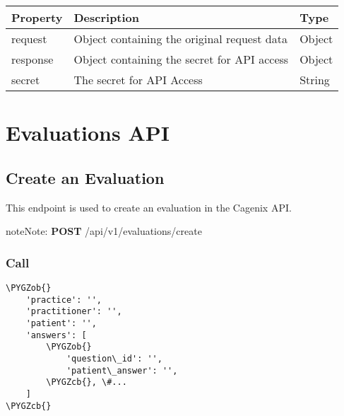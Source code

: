 \documentclass[letterpaper,10pt,english]{sphinxmanual}
\def\PYGZob{\char`\{}
\def\PYGZcb{\char`\}}
\begin{document}
\begin{tabulary}{\linewidth}{|L|L|L|}
\hline
\textsf{\relax 
Property
} & \textsf{\relax 
Description
} & \textsf{\relax 
Type
}\\
\hline
request
 & 
Object containing the original
request data
 & 
Object
\\

response
 & 
Object containing the secret for
API access
 & 
Object
\\

secret
 & 
The secret for API Access
 & 
String
\\
\hline\end{tabulary}



\chapter{Evaluations API}
\label{dev-api-evaluations::doc}\label{dev-api-evaluations:evaluations-api}

\section{Create an Evaluation}
\label{dev-api-evaluations:create-an-evaluation}
This endpoint is used to create an evaluation in the Cagenix API.

\begin{notice}{note}{Note:}
\textbf{POST} /api/v1/evaluations/create
\end{notice}


\subsection{Call}
\label{dev-api-evaluations:call}
\begin{Verbatim}[commandchars=\\\{\}]
\PYGZob{}
    'practice': '',
    'practitioner': '',
    'patient': '',
    'answers': [
        \PYGZob{}
            'question\_id': '',
            'patient\_answer': '',
        \PYGZcb{}, \#...
    ]
\PYGZcb{}
\end{Verbatim}
\end{document}
